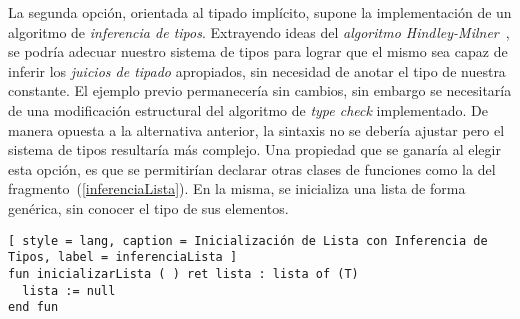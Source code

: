 La segunda opción, orientada al tipado implícito, supone la implementación de un algoritmo de \textit{inferencia de tipos}.
Extrayendo ideas del \textit{algoritmo Hindley-Milner}~\cite{Inferencia}, se podría adecuar nuestro sistema de tipos para lograr que el mismo sea capaz de inferir los \textit{juicios de tipado} apropiados, sin necesidad de anotar el tipo de nuestra constante.
El ejemplo previo permanecería sin cambios, sin embargo se necesitaría de una modificación estructural del algoritmo de \textit{type check} implementado.
De manera opuesta a la alternativa anterior, la sintaxis no se debería ajustar pero el sistema de tipos resultaría más complejo.
Una propiedad que se ganaría al elegir esta opción, es que se permitirían declarar otras clases de funciones como la del fragmento~(\ref{inferenciaLista}).
En la misma, se inicializa una lista de forma genérica, sin conocer el tipo de sus elementos.

\begin{lstlisting}[ style = lang, caption = Inicialización de Lista con Inferencia de Tipos, label = inferenciaLista ]
fun inicializarLista ( ) ret lista : lista of (T)
  lista := null
end fun
\end{lstlisting}

\iffalse


Este concepto permitiría deducir el tipo de la constante, sin necesidad de modificar la sintaxis del lenguaje pero complicando el chequeo de tipos del intérprete.
\fi

\iffalse
\subsection{Forzar Indentación}
\subsection{Phantom Types}
\fi